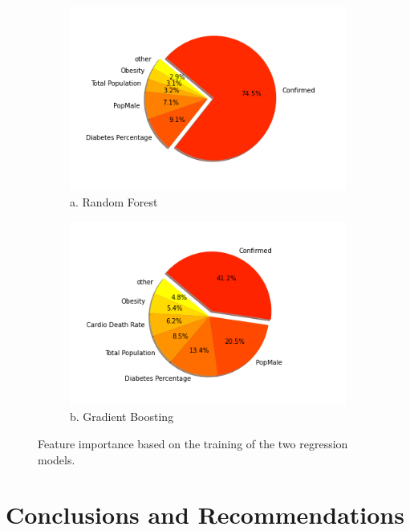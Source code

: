 \documentclass[a4paper, 11pt]{article} %
\begin{document}
\begin{figure}[htbp]
\begin{subfigure}{0.5\textwidth}
\centering 
   \includegraphics[width=\linewidth]{figures/Pie_RandomForest.png} 
   a. Random Forest
  \end{subfigure}
     \begin{subfigure}{0.5\textwidth}
  \centering
   \includegraphics[width=\linewidth]{figures/Pie_GradientBoosting.png} 
     b. Gradient Boosting
  \end{subfigure}
   \caption{Feature importance based on the training of the two regression models.}
   \label{fig:Pies}
\end{figure}


\section{Conclusions and Recommendations}
\end{document}
